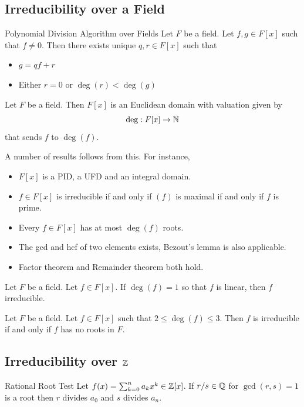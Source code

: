\documentclass[a4paper]{article}
\begin{document}
\subsection{Irreducibility over a Field}
\begin{thm}{Polynomial Division Algorithm over Fields}{} Let $F$ be a field. Let $f,g\in F[x]$ such that $f\neq 0$. Then there exists unique $q,r\in F[x]$ such that 
\begin{itemize}
\item $g=qf+r$
\item Either $r=0$ or $\deg(r)<\deg(g)$
\end{itemize}
\end{thm}

\begin{lmm}{}{} Let $F$ be a field. Then $F[x]$ is an Euclidean domain with valuation given by $$\deg:F[x]\to\mathbb{N}$$ that sends $f$ to $\deg(f)$. 
\end{lmm}

A number of results follows from this. For instance, 
\begin{itemize}
\item $F[x]$ is a PID, a UFD and an integral domain. 
\item $f\in F[x]$ is irreducible if and only if $(f)$ is maximal if and only if $f$ is prime. 
\item Every $f\in F[x]$ has at most $\deg(f)$ roots. 
\item The gcd and hcf of two elements exists, Bezout's lemma is also applicable. 
\item Factor theorem and Remainder theorem both hold. 
\end{itemize}

\begin{prp}{}{} Let $F$ be a field. Let $f\in F[x]$. If $\deg(f)=1$ so that $f$ is linear, then $f$ irreducible. 
\end{prp}

\begin{prp}{}{} Let $F$ be a field. Let $f\in F[x]$ such that $2\leq\deg(f)\leq 3$. Then $f$ is irreducible if and only if $f$ has no roots in $F$. 
\end{prp}

\subsection{Irreducibility over $\mathbb{Z}$}
\begin{thm}{Rational Root Test}{} Let $f(x)=\sum_{k=0}^na_kx^k\in\mathbb{Z}[x]$. If $r/s\in\mathbb{Q}$ for $\gcd(r,s)=1$ is a root then $r$ divides $a_0$ and $s$ divides $a_n$. 
\end{thm}
\end{document}

